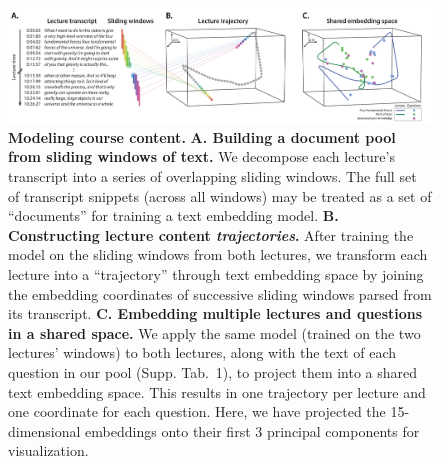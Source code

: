 \documentclass[10pt]{article}
\newcommand{\questions}{1}
\begin{document}
\begin{figure}[tp]
    \centering
    \includegraphics[width=\textwidth]{figs/sliding_windows}

    \caption{\textbf{Modeling course content.} \textbf{A. Building a document
    pool from sliding windows of text.} We decompose each lecture's transcript
    into a series of overlapping sliding windows. The full set of transcript
    snippets (across all windows) may be treated as a set of ``documents'' for
    training a text embedding model. \textbf{B. Constructing lecture content
    \textit{trajectories}.} After training the model on the sliding windows
    from both lectures, we transform each lecture into a ``trajectory'' through
    text embedding space by joining the embedding coordinates of successive
    sliding windows parsed from its transcript. \textbf{C. Embedding multiple
    lectures and questions in a shared space.} We apply the same model (trained
    on the two lectures' windows) to both lectures, along with the text of each
    question in our pool (Supp. Tab.~\questions), to project them into a shared
    text embedding space. This results in one trajectory per lecture and one
    coordinate for each question. Here, we have projected the 15-dimensional
    embeddings onto their first 3 principal components for visualization.}

    \label{fig:sliding-windows}
\end{figure}
\end{document}
